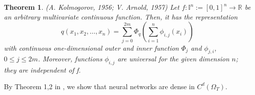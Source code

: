 \documentclass{article}
\newtheorem{theorem}{Theorem}[section]
\begin{document}

\begin{theorem}
	 (\textit{A. Kolmogorov, 1956; V. Arnold, 1957}) Let $f : \mathbb{I}^{n} := [0,1]^{n} \rightarrow\mathbb{R}$ be an arbitrary multivariate continuous function. Then, it has the representation
	 \begin{equation}
	 q(x_1,x_2, \dots, x_n)=\sum_{j=0}^{2m}\Phi_{q}\left(\sum_{i=1}^{n}\phi_{i,j}(x_i)\right)
	 \label{eq:komo}
	 \end{equation}
	 with continuous one-dimensional outer and inner function $\Phi_{j}$ and $\phi_{j,i}$, $0\le j\le 2m$.
Moreover, functions $\phi_{i,j}$ are universal for the given dimension $n$; they are independent of f.
	\end{theorem}
By Theorem 1,2 in \cite{hornik}, we show that neural networks are dense in $C^{d}(\Omega_{T})$.
\end{document}
